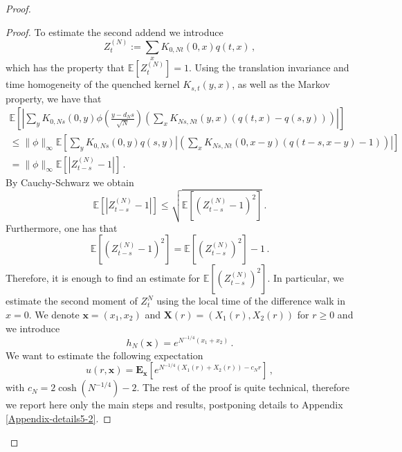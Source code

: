 \documentclass[a4paper,11pt,oneside,reqno]{amsart}
\theoremstyle{definition}
\renewcommand{\leq}{\leqslant}
\renewcommand{\geq}{\geqslant}
\numberwithin{equation}{section}
\begin{document}
\begin{proof}
\begin{proof}
{					To estimate the second addend we introduce 
					\begin{equation*}
						Z_{t}^{(N)}:= \sum_{x}K_{0,Nt}(0,x)q(t,x)\,,
					\end{equation*}
					which has  the property that $\mathbb{E}\left[Z_{t}^{(N)}\right]=1$. 
					Using the translation invariance and time homogeneity of the quenched kernel $K_{s,t}(y,x)$, as well as the Markov property, we have that 
					\begin{multline*}	\mathbb{E}\left[\left|\sum_{y}K_{0,Ns}(0,y)\phi\left(\frac{y-d_{N}s}{\sqrt{N}}\right)\left(\sum_{x}K_{Ns,Nt}(y,x)(q(t,x)-q(s,y))\right)\right|\right]
							\\\leq 	
							\lVert \phi\rVert_{\infty}\mathbb{E}\left[	\sum_{y}K_{0,Ns}(0,y)q(s,y)\left|\left(\sum_{x}K_{Ns,Nt}(0,x-y)(q(t-s,x-y)-1)\right)\right|\right]
							\\= \lVert \phi\rVert_{\infty}	\mathbb{E}\left[\left|Z_{t-s}^{(N)}-1\right|\right]\,.
					\end{multline*}
					By Cauchy-Schwarz we obtain
					\begin{equation*}
							\mathbb{E}\left[\left|Z_{t-s}^{(N)}-1\right|\right]\leq \sqrt{\mathbb{E}\left[\left(Z_{t-s}^{(N)}-1\right)^{2}\right]}\,.
					\end{equation*}
					Furthermore, one has that 
					\begin{equation*}
						\mathbb{E}\left[(Z_{t-s}^{(N)}-1)^{2}\right]=\mathbb{E}\left[(Z_{t-s}^{(N)})^{2}\right]-1\,.
					\end{equation*}
					Therefore, it is enough to find an estimate for $\mathbb{E}\left[(Z_{t-s}^{(N)})^{2}\right]$. In particular, we estimate the second moment of $Z_{t}^{N}$ using the local time of the difference walk in $x=0$. We denote $\bm{x}=(x_{1},x_{2})$ and $\bm{X}(r)=(X_{1}(r),X_{2}(r))$ for $r\geq 0$ and we introduce
					\begin{equation*}
						h_{N}(\bm{x})=e^{N^{-1/4}(x_{1}+x_{2})}\,.
					\end{equation*}
					We want to estimate the following expectation 
					\begin{equation*}
						u(r,\bm{x})=	\mathbf{E}_{\bm{x}}\left[e^{N^{-1/4}(X_{1}(r)+X_{2}(r))-c_{N}r }\right]\,,
					\end{equation*}
					with $c_{N}=2\cosh(N^{-1/4})-2$.
					The rest of the proof is quite technical, therefore we report here only the main steps and results, postponing details  to Appendix \ref{Appendix-details5-2}. 
					
}
\end{proof}
\end{proof}
\end{document}

